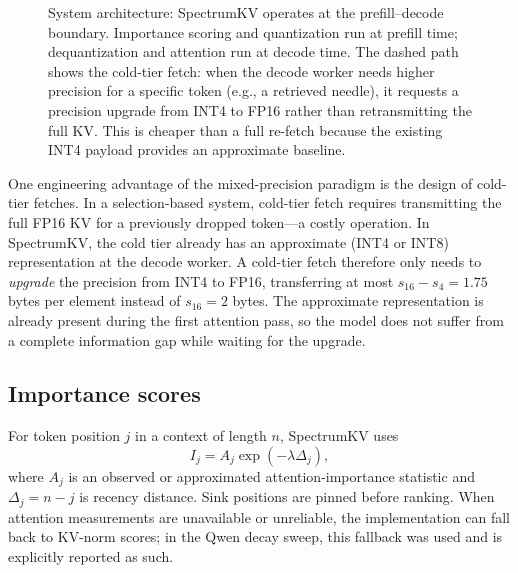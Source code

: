 \documentclass[11pt]{article}
\newcommand{\method}{SpectrumKV}
\theoremstyle{plain}
\theoremstyle{definition}
\begin{document}
\begin{figure}[t]
{%
}
\caption{System architecture: \method{} operates at the prefill--decode boundary.  Importance scoring and quantization run at prefill time; dequantization and attention run at decode time.  The dashed path shows the cold-tier fetch: when the decode worker needs higher precision for a specific token (e.g., a retrieved needle), it requests a precision upgrade from INT4 to FP16 rather than retransmitting the full KV.  This is cheaper than a full re-fetch because the existing INT4 payload provides an approximate baseline.}
\label{fig:sysarch}
\end{figure}

One engineering advantage of the mixed-precision paradigm is the design of cold-tier fetches.  In a selection-based system, cold-tier fetch requires transmitting the full FP16 KV for a previously dropped token---a costly operation.  In \method{}, the cold tier already has an approximate (INT4 or INT8) representation at the decode worker.  A cold-tier fetch therefore only needs to \emph{upgrade} the precision from INT4 to FP16, transferring at most $s_{16}-s_4 = 1.75$ bytes per element instead of $s_{16} = 2$ bytes.  The approximate representation is already present during the first attention pass, so the model does not suffer from a complete information gap while waiting for the upgrade.

\subsection{Importance scores}
For token position $j$ in a context of length $n$, \method{} uses
\begin{equation}
  I_j = A_j \exp(-\lambda \Delta_j),
  \label{eq:importance}
\end{equation}
where $A_j$ is an observed or approximated attention-importance statistic and $\Delta_j=n-j$ is recency distance.  Sink positions are pinned before ranking.  When attention measurements are unavailable or unreliable, the implementation can fall back to KV-norm scores; in the Qwen decay sweep, this fallback was used and is explicitly reported as such.
\end{document}
